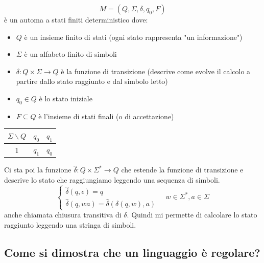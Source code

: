 \documentclass[a4paper]{article}
\begin{document}
\begin{figure}[H]
    \centering
  \end{figure}

{
    \[M = (Q, \Sigma, \delta, q_0, F)\]
    è un automa a stati finiti deterministico dove:
    \begin{itemize}
        \item $Q$ è un insieme finito di stati (ogni stato rappresenta "un informazione")
        \item $\Sigma$ è un alfabeto finito di simboli
        \item $\delta : Q \times \Sigma \rightarrow Q$ è la funzione di transizione (descrive come evolve il
        calcolo a partire dallo stato raggiunto e dal simbolo letto)
        \item $q_0 \in Q$ è lo stato iniziale
        \item $F \subseteq Q$ è l'insieme di stati finali (o di accettazione)
    \end{itemize}
}
\begin{table}[H]
    \centering
    \begin{tabular}{|c|c|c|}
        \hline
        $\Sigma \backslash Q$ & $q_0$ & $q_1$\\
        \hline
        1 & $q_1$ & $q_0$ \\
        \hline
    \end{tabular}
\end{table}
\noindent
Ci sta poi la funzione $\hat{\delta} : Q \times \Sigma^* \rightarrow Q$ che estende la funzione di transizione e descrive
lo stato che raggiungiamo leggendo una sequenza di simboli.
\[
\begin{cases}
    \hat{\delta}(q, \epsilon) = q\\
    \hat{\delta}(q, w a) = \hat{\delta}(\delta(q,w), a)
\end{cases}
\quad w \in \Sigma^*, a \in \Sigma
\]
anche chiamata chiusura transitiva di $\delta$. Quindi mi permette
di calcolare lo stato raggiunto leggendo una stringa di simboli.

\subsection{Come si dimostra che un linguaggio è regolare?}
\end{document}
